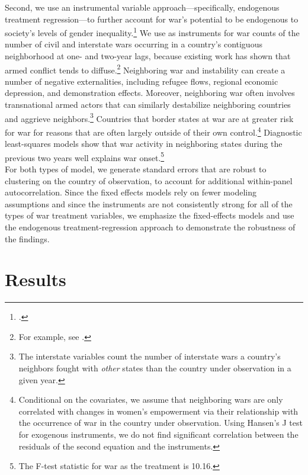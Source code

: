 \documentclass [12pt] {article}
\begin{document}
Second, we use an instrumental variable approach---specifically, endogenous treatment regression---to further account for war's potential to be endogenous to society's levels of gender inequality.\footnote{.}  We use as instruments for war counts of the number of civil and interstate wars occurring in a country's contiguous neighborhood at one- and two-year lags, because existing work has shown that armed conflict tends to diffuse.\footnote{For example, see .} Neighboring war and instability can create a number of negative externalities, including refugee flows, regional economic depression, and demonstration effects. Moreover, neighboring war often involves transnational armed actors that can similarly destabilize neighboring countries and aggrieve neighbors.\footnote{The interstate variables count the number of interstate wars a country's neighbors fought with {\it other} states than the country under observation in a given year.}  Countries that border states at war are at greater risk for war for reasons that are often largely outside of their own control.\footnote{Conditional on the covariates, we assume that neighboring wars are only correlated with changes in women's empowerment via their relationship with the occurrence of war in the country under observation. Using Hansen's J test for exogenous instruments, we do not find significant correlation between the residuals of the second equation and the instruments. } Diagnostic least-squares models show that war activity in neighboring states during the previous two years well explains war onset.\footnote{The F-test statistic for war as the treatment is 10.16.}  \\

For both types of model, we generate standard errors that are robust to clustering on the country of observation, to account for additional within-panel autocorrelation. Since the fixed effects models rely on fewer modeling assumptions and since the instruments are not consistently strong for all of the types of war treatment variables, we emphasize the fixed-effects models and use the endogenous treatment-regression approach to demonstrate the robustness of the findings.\\


\section*{Results}
\label{result}
\vspace*{.2in}
\end{document}
